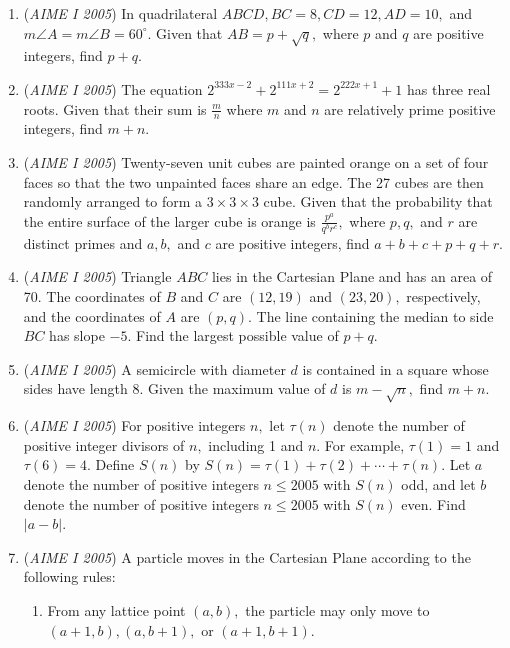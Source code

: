 \begin{enumerate}
	\item (\textit{AIME I 2005}) In quadrilateral $ABCD, BC=8, CD=12, AD=10,$ and $m\angle A= m\angle B = 60^\circ.$ Given that $AB = p + \sqrt{q},$ where $p$ and $q$ are positive integers, find $p+q.$


	\item (\textit{AIME I 2005}) The equation $2^{333x-2} + 2^{111x+2} = 2^{222x+1} + 1$ has three real roots. Given that their sum is $\frac mn$ where $m$ and $n$ are relatively prime positive integers, find $m+n.$


	\item (\textit{AIME I 2005}) Twenty-seven unit cubes are painted orange on a set of four faces so that the two unpainted faces share an edge. The 27 cubes are then randomly arranged to form a $3\times 3 \times 3$ cube. Given that the probability that the entire surface of the larger cube is orange is $\frac{p^a}{q^br^c},$ where $p,q,$ and $r$ are distinct primes and $a,b,$ and $c$ are positive integers, find $a+b+c+p+q+r.$


	\item (\textit{AIME I 2005}) Triangle $ABC$ lies in the Cartesian Plane and has an area of 70. The coordinates of $B$ and $C$ are $(12,19)$ and $(23,20),$ respectively, and the coordinates of $A$ are $(p,q).$ The line containing the median to side $BC$ has slope $-5.$ Find the largest possible value of $p+q.$


	\item (\textit{AIME I 2005}) A semicircle with diameter $d$ is contained in a square whose sides have length 8. Given the maximum value of $d$ is $m - \sqrt{n},$ find $m+n.$


	\item (\textit{AIME I 2005}) For positive integers $n,$ let $\tau (n)$ denote the number of positive integer divisors of $n,$ including 1 and $n.$ For example, $\tau (1)=1$ and $\tau(6) =4.$ Define $S(n)$ by $S(n)=\tau(1)+ \tau(2) + \cdots + \tau(n).$ Let $a$ denote the number of positive integers $n \leq 2005$ with $S(n)$ odd, and let $b$ denote the number of positive integers $n \leq 2005$ with $S(n)$ even. Find $|a-b|.$


	\item (\textit{AIME I 2005}) A particle moves in the Cartesian Plane according to the following rules:


 
            \begin{enumerate}
        \item From any lattice point $(a,b),$ the particle may only move to $(a+1,b), (a,b+1),$ or $(a+1,b+1).$


\end{enumerate}
\end{enumerate}
